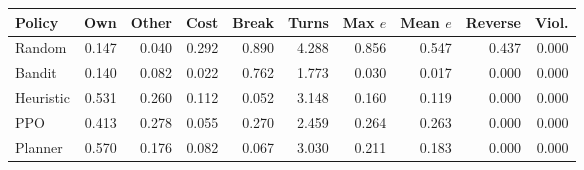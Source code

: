 \begin{tabular}{lrrrrrrrrr}
\toprule
Policy & Own & Other & Cost & Break & Turns & Max $e$ & Mean $e$ & Reverse & Viol. \\
\midrule
Random & 0.147 & 0.040 & 0.292 & 0.890 & 4.288 & 0.856 & 0.547 & 0.437 & 0.000 \\
Bandit & 0.140 & 0.082 & 0.022 & 0.762 & 1.773 & 0.030 & 0.017 & 0.000 & 0.000 \\
Heuristic & 0.531 & 0.260 & 0.112 & 0.052 & 3.148 & 0.160 & 0.119 & 0.000 & 0.000 \\
PPO & 0.413 & 0.278 & 0.055 & 0.270 & 2.459 & 0.264 & 0.263 & 0.000 & 0.000 \\
Planner & 0.570 & 0.176 & 0.082 & 0.067 & 3.030 & 0.211 & 0.183 & 0.000 & 0.000 \\
\bottomrule
\end{tabular}
